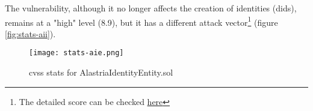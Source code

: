 The vulnerability, although it no longer affects the creation of identities (\acrshort{did}s), remains at a "high" level (8.9), but it has a different attack vector\footnote{The detailed score can be checked \href{https://nvd.nist.gov/vuln-metrics/cvss/v3-calculator?vector=AV:N/AC:L/PR:H/UI:N/S:C/C:H/I:N/A:N/E:F/RL:O/RC:R/CR:H/IR:X/AR:X/MAV:N/MAC:L/MPR:N/MUI:N/MS:C/MC:H/MI:X/MA:X&version=3.1}{here}} (figure \ref{fig:stats-aii}).\\
\begin{figure}[h]
    \centering
    \texttt{[image: stats-aie.png]}
    \caption{\acrshort{cvss} stats for AlastriaIdentityEntity.sol}
    \label{fig:stats-aie}
\end{figure}